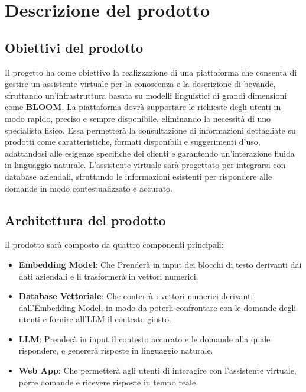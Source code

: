 \section{Descrizione del prodotto}

\subsection{Obiettivi del prodotto}
Il progetto ha come obiettivo la realizzazione di una piattaforma che consenta di 
gestire un assistente virtuale per la conoscenza e la descrizione di bevande, 
sfruttando un’infrastruttura basata su modelli linguistici di grandi dimensioni come \textbf{BLOOM}. 
La piattaforma dovrà supportare le richieste degli utenti in modo rapido, 
preciso e sempre disponibile, eliminando la necessità di uno specialista fisico. 
Essa permetterà la consultazione di informazioni dettagliate su prodotti come caratteristiche, 
formati disponibili e suggerimenti d’uso, adattandosi alle esigenze specifiche 
dei clienti e garantendo un’interazione fluida in linguaggio naturale. 
L’assistente virtuale sarà progettato per integrarsi con database aziendali, 
sfruttando le informazioni esistenti per rispondere alle domande in modo 
contestualizzato e accurato.

\subsection{Architettura del prodotto}
Il prodotto sarà composto da quattro componenti principali:
\begin{itemize}
    \item \textbf{Embedding Model}: Che Prenderà in input dei blocchi di testo derivanti dai dati aziendali e li trasformerà in vettori numerici.
    \item \textbf{Database Vettoriale}: Che conterrà i vettori numerici derivanti dall'Embedding Model, in modo da poterli confrontare con le domande degli utenti e fornire all'LLM il contesto giusto. 
    \item \textbf{LLM}: Prenderà in input il contesto accurato e le domande alla quale rispondere, e genererà risposte in linguaggio naturale. 
    \item \textbf{Web App}: Che permetterà agli utenti di interagire con l'assistente virtuale, porre domande e ricevere risposte in tempo reale. 
\end{itemize}

